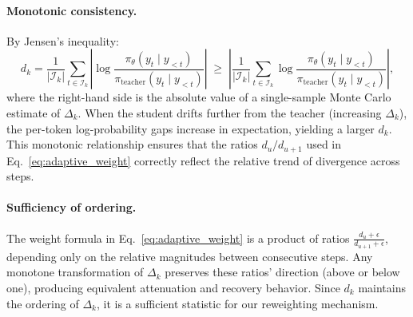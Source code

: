 \paragraph{Monotonic consistency.}
By Jensen's inequality:
\begin{equation}
    d_k = \frac{1}{|\mathcal{I}_k|} \sum_{t \in \mathcal{I}_k} \left| \log \frac{\pi_\theta(y_t \mid y_{<t})}{\pi_{\mathrm{teacher}}(y_t \mid y_{<t})} \right|
    \;\ge\;
    \left| \frac{1}{|\mathcal{I}_k|} \sum_{t \in \mathcal{I}_k} \log \frac{\pi_\theta(y_t \mid y_{<t})}{\pi_{\mathrm{teacher}}(y_t \mid y_{<t})} \right|,
\end{equation}
where the right-hand side is the absolute value of a single-sample Monte Carlo estimate of $\Delta_k$. When the student drifts further from the teacher (increasing $\Delta_k$), the per-token log-probability gaps increase in expectation, yielding a larger $d_k$. This monotonic relationship ensures that the ratios $d_u / d_{u+1}$ used in Eq.~\eqref{eq:adaptive_weight} correctly reflect the relative trend of divergence across steps.

\paragraph{Sufficiency of ordering.}
The weight formula in Eq.~\eqref{eq:adaptive_weight} is a product of ratios $\frac{d_u + \epsilon}{d_{u+1} + \epsilon}$, depending only on the relative magnitudes between consecutive steps. Any monotone transformation of $\Delta_k$ preserves these ratios' direction (above or below one), producing equivalent attenuation and recovery behavior. Since $d_k$ maintains the ordering of $\Delta_k$, it is a sufficient statistic for our reweighting mechanism.
